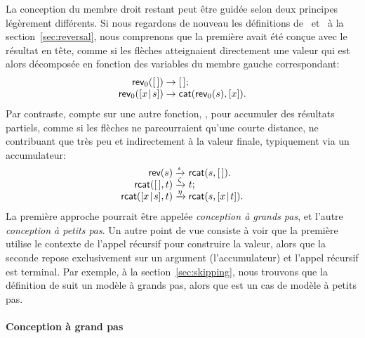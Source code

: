 La conception du membre droit restant peut
être guidée selon deux principes légèrement différents. Si nous
regardons de nouveau les définitions de~
 et~
à la section~\ref{sec:reversal}, nous comprenons que la première avait
été conçue avec le résultat en tête, comme si les flèches atteignaient
directement une valeur qui est alors décomposée en fonction des
variables du membre gauche correspondant:
\begin{equation*}
\begin{array}{r@{\;}l@{\;}l}
\fun{rev}_0(\el) & \rightarrow & \el;\\
\fun{rev}_0(\cons{x}{s}) & \rightarrow &
\fun{cat}(\fun{rev}_0(s),[x]).
\end{array}
\end{equation*}
Par contraste,
 compte sur une autre fonction,
, pour accumuler des résultats
partiels, comme si les flèches ne parcourraient qu'une courte
distance, ne contribuant que très peu et indirectement à la valeur
finale, typiquement via un accumulateur:
\begin{equation*}
\begin{array}{r@{\;}l@{\;}l}
\fun{rev}(s) & \smashedrightarrow{\epsilon} & \fun{rcat}(s,\el).\\
\fun{rcat}(\el,t) & \smashedrightarrow{\zeta} & t;\\
\fun{rcat}(\cons{x}{s},t) & \smashedrightarrow{\eta} &
\fun{rcat}(s,\cons{x}{t}).
\end{array}
\end{equation*}
La première approche pourrait être appelée \emph{conception à grands
  pas}, et l'autre \emph{conception à
  petits pas}. Un autre point de vue
consiste à voir que la première utilise le contexte de l'appel
récursif pour construire la valeur, alors que la seconde repose
exclusivement sur un argument (l'accumulateur) et l'appel récursif est terminal. Par
exemple, à la section~\ref{sec:skipping}, nous trouvons que la
définition de  suit un modèle à
grands pas, alors que  est
un cas de modèle à petits pas.

\paragraph{Conception à grand pas}
\label{big-step}

